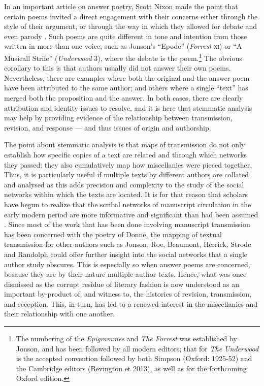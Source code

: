 \begin{paper}
In an important article on answer poetry, Scott Nixon made the point that
certain poems invited a direct engagement with their concerns either
through the style of their argument, or through the way in which they allowed
for debate and even parody \citep{nixon_aske_1999}. Such poems are quite different in tone and intention from those
written in more than one voice, such as Jonson's ``Epode'' (\emph{Forrest}
\textsc{xi}) or ``A Musicall Strife'' (\emph{Underwood} 3), where the
debate is the poem.\footnote{The numbering of the \textit{Epigrammes} and \textit{The Forrest} was established by Jonson, and has been followed by all modern editors; that for \textit{The Underwood} is the accepted convention followed by both Simpson (Oxford: 1925-52) and the Cambridge editors (Bevington et 2013), as well as for the forthcoming Oxford edition.} The obvious corollary to this is that authors
usually did not answer their own poems. Nevertheless, there are examples
where both the original and the answer poem have been attributed to the
same author; and others where a single ``text'' has merged both the
proposition and the answer. In both cases, there are clearly attribution
and identity issues to resolve, and it is here that stemmatic analysis
may help by providing evidence of the relationship between transmission,
revision, and response --- and thus issues of origin and authorship.

The point about stemmatic analysis is that maps of
transmission do not only establish how specific copies of a text are related and through which networks they passed: they also cumulatively map how
miscellanies were pieced together. Thus, it is particularly useful if
multiple texts by different authors are collated and analysed as this
adds precision and complexity to the study of the social networks within
which the texts are located. It is for that reason that scholars have
begun to realize that the scribal networks of manuscript circulation in
the early modern period are more informative and significant than had
been assumed \citep{bland_stemmatics_2013}. Since most of the work that has been done
involving manuscript transmission has been concerned with the poetry of
Donne, the mapping of textual transmission for other authors such as
Jonson, Roe, Beaumont, Herrick, Strode and Randolph could offer further
insight into the social networks that a single author study
obscures. This is especially so when answer poems are concerned, because they are
by their nature multiple author texts. Hence, what was once dismissed
as the corrupt residue of literary fashion is now understood as an
important by-product of, and witness to, the histories of revision,
transmission, and reception. This, in turn, has led to a renewed
interest in the miscellanies and their relationship with one another.


\end{paper}
